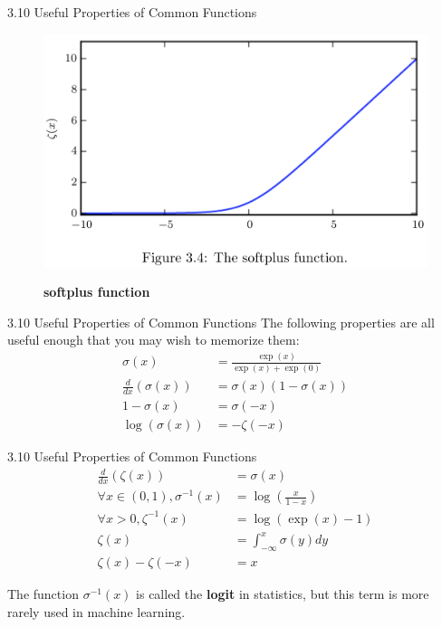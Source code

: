 \begin{frame}{3.10 Useful Properties of Common Functions}
    \begin{figure}
        \centering
        \includegraphics[scale=0.20]{images/3-4-softplus.png}
        \label{fig:3_4softplus}
        \caption{\textbf{softplus function}}
    \end{figure}
\end{frame}

\begin{frame}{3.10 Useful Properties of Common Functions}
    \justifying
    The following properties are all useful enough that you may wish to memorize them:
    \begin{align}
        \sigma(x) &= \frac{\exp(x)}{\exp(x) + \exp(0)} \label{eq:3_33} \\
        \frac{d}{dx}\left(\sigma(x)\right) &= \sigma(x)(1 - \sigma(x)) \label{eq:3_34} \\
        1 - \sigma(x) &= \sigma(-x) \label{eq:3_35} \\
        \log(\sigma(x)) &= -\zeta(-x) \label{eq:3_36}
    \end{align}
\end{frame}

\begin{frame}{3.10 Useful Properties of Common Functions}
    \begin{align}
        \frac{d}{dx}\left(\zeta(x)\right) &= \sigma(x) \label{eq:3_37} \\
        \forall x \in (0, 1), \sigma^{-1}(x) &= \log\left(\frac{x}{1 - x}\right) \label{eq:3_38} \\
        \forall x > 0, \zeta^{-1}(x) &= \log(\exp(x) - 1) \label{eq:3_39} \\
        \zeta(x) &= \int^{x}_{-\infty}\sigma(y)dy \label{eq:3_40} \\
        \zeta(x) - \zeta(-x) & = x \label{eq:3_41}
    \end{align}
    
    The function $\sigma^{-1}(x)$ is called the \textbf{logit} in statistics, but this term is more rarely used in machine learning.
\end{frame}

